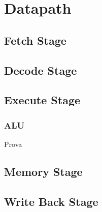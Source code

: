 %
\chapter{Datapath}
\label{cha2}
\section{Fetch Stage}
\section{Decode Stage}
\section{Execute Stage}
\subsection{ALU}
Prova

\section{Memory Stage}
\section{Write Back Stage}
